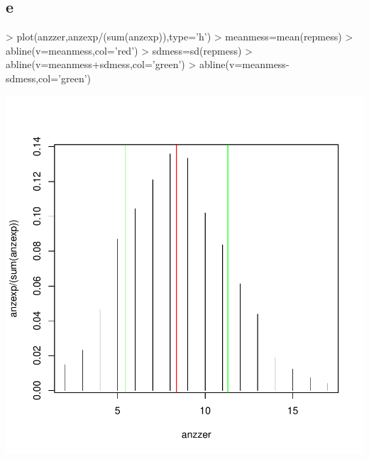 \subsection{e}
\begin{Schunk}
\begin{Sinput}
> plot(anzzer,anzexp/(sum(anzexp)),type='h')
> meanmess=mean(repmess)
> abline(v=meanmess,col='red')
> sdmess=sd(repmess)
> abline(v=meanmess+sdmess,col='green')
> abline(v=meanmess-sdmess,col='green')
\end{Sinput}
\end{Schunk}
\includegraphics{sw10_1-006}

